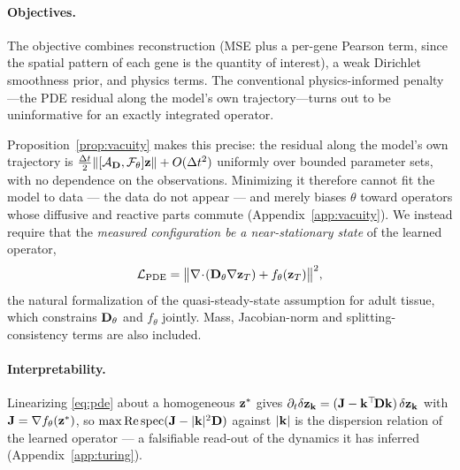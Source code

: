 \paragraph{Objectives.}
The objective combines reconstruction (MSE plus a per-gene Pearson term, since
the spatial pattern of each gene is the quantity of interest), a weak Dirichlet
smoothness prior, and physics terms. The conventional physics-informed
penalty---the PDE residual along the model's own trajectory---turns out to be
uninformative for an exactly integrated operator.

Proposition~\ref{prop:vacuity} makes this precise: the residual along the
model's own trajectory is $\tfrac{\Delta t}{2}\|[\mathcal{A}_{\mathbf{D}},
\mathcal{F}_\theta]\mathbf{z}\| + O(\Delta t^2)$ uniformly over bounded parameter sets,
with no dependence on the observations. Minimizing it therefore cannot fit the
model to data --- the data do not appear --- and merely biases $\theta$ toward
operators whose diffusive and reactive parts commute
(Appendix~\ref{app:vacuity}). We instead require that the \emph{measured
configuration be a near-stationary state} of the learned operator,
\begin{equation}
\mathcal{L}_{\mathrm{PDE}} = \big\| \nabla\!\cdot\!(\mathbf{D}_\theta \nabla \mathbf{z}_T)
  + f_\theta(\mathbf{z}_T) \big\|^2 ,
\label{eq:steady}
\end{equation}
the natural formalization of the quasi-steady-state assumption for adult tissue,
which constrains $\mathbf{D}_\theta$ and $f_\theta$ jointly. Mass, Jacobian-norm and
splitting-consistency terms are also included.

\paragraph{Interpretability.}
Linearizing \eqref{eq:pde} about a homogeneous $\mathbf{z}^*$ gives $\partial_t
\delta\mathbf{z}_{\mathbf{k}} = (\mathbf{J} - \mathbf{k}^\top\!\mathbf{D}\mathbf{k})\,\delta\mathbf{z}_{\mathbf{k}}$ with $\mathbf{J} =
\nabla f_\theta(\mathbf{z}^*)$, so $\max\mathrm{Re}\,\mathrm{spec}(\mathbf{J} - |\mathbf{k}|^2\mathbf{D})$
against $|\mathbf{k}|$ is the dispersion relation of the learned operator --- a
falsifiable read-out of the dynamics it has inferred (Appendix~\ref{app:turing}).

